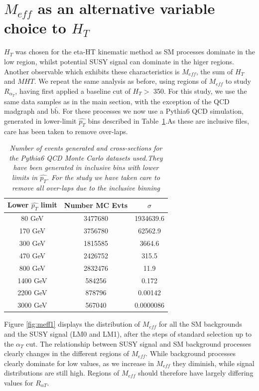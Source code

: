 \section{$M_{eff}$ as an alternative variable choice to $H_{T}$}

$H_{T}$ was chosen for the eta-HT kinematic method as SM processes dominate in the low region, whilst potential SUSY signal can dominate in the higer regions. Another observable which exhibits these characteristics is $M_{eff}$, the sum of $H_{T}$ and $MHT$. We repeat the same analysis as before, using regions of $M_{eff}$ to study $R_{\alpha_{T}}$, having first applied a baseline cut of $H_{T} >$ 350. For this study, we use the same data samples as in the main section, with the exception of the QCD madgraph and $\mathrm{b \bar{b}}$. For these processes we now use a Pythia6 QCD simulation, generated in lower-limit $\hat{p_{T}}$ bins described in Table~\ref{tab:pyth}.As these are inclusive files, care has been taken to remove over-laps. 

\begin{table}[h!]
\centering
\begin{tabular}{|c||c||c|}
\hline
Lower $\hat{p_{T}}$ limit & Number MC Evts & $\sigma$ \\
\hline
\hline
80 GeV & 3477680 & 1934639.6 \\ 
\hline
170 GeV & 3756780 & 62562.9 \\ 
\hline
300 GeV & 1815585 & 3664.6 \\
\hline
470 GeV & 2426752 & 315.5 \\ 
\hline
800 GeV & 2832476 & 11.9 \\ 
\hline
1400 GeV & 584256 & 0.172 \\ 
\hline
2200 GeV & 878796 & 0.00142 \\ 
\hline
3000 GeV & 567040 & 0.0000086 \\
\hline
\end{tabular}
   \caption{\small{\textit{Number of events generated and cross-sections for the Pythia6 QCD Monte Carlo datasets used.They have been generated in inclusive bins with lower limits in $\hat{p_{T}}$. For the study we have taken care to remove all over-laps due to the inclusive binning}}}
 \label{tab:pyth} 
\end{table}

Figure \ref{fig:meff1} displays the distribution of $M_{eff}$ for all the SM backgrounds and the SUSY signal (LM0 and LM1), after the steps of standard selection up to the $\alpha_{T}$ cut. The relationship between SUSY signal and SM background processes clearly changes in the different regions of $M_{eff}$. While background processes clearly dominate for low values, as we increase in $M_{eff}$ they diminish, while signal distributions are still high. Regions of $M_{eff}$ should therefore have largely differing values for $R_{\alpha T}$.


